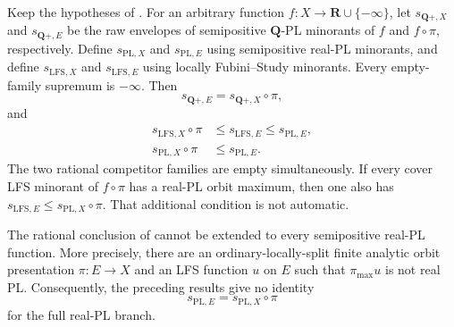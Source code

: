 \begin{theorem}
\label{thm:p031-orbit-envelope-comparison}
Keep the hypotheses of .  For an
arbitrary function $f:X\to\mathbf R\cup\{-\infty\}$, let
$s_{\mathbf Q+,X}$ and $s_{\mathbf Q+,E}$ be the raw envelopes of
semipositive $\mathbf Q$-PL minorants of $f$ and $f\circ\pi$,
respectively.  Define $s_{\mathrm{PL},X}$ and $s_{\mathrm{PL},E}$ using
semipositive real-PL minorants, and define $s_{\mathrm{LFS},X}$ and
$s_{\mathrm{LFS},E}$ using locally Fubini--Study minorants.  Every
empty-family supremum is $-\infty$.  Then
\begin{equation}
\label{eq:p031-rational-semipositive-envelope-pullback}
                  s_{\mathbf Q+,E}
                    =s_{\mathbf Q+,X}\circ\pi,
\end{equation}
and
\begin{equation}
\label{eq:p031-lfs-pl-envelope-chain}
 \begin{aligned}
 s_{\mathrm{LFS},X}\circ\pi
       &\leq s_{\mathrm{LFS},E}\leq s_{\mathrm{PL},E},\\
 s_{\mathrm{PL},X}\circ\pi
       &\leq s_{\mathrm{PL},E}.
 \end{aligned}
\end{equation}
The two rational competitor families are empty simultaneously. If every
cover LFS minorant of $f\circ\pi$ has a real-PL orbit maximum, then one
also has $s_{\mathrm{LFS},E}\leq s_{\mathrm{PL},X}\circ\pi$.
That additional condition is not automatic.
\end{theorem}

\begin{proposition}
\label{prop:p031-real-pl-fiber-maximum-failure}
The rational conclusion of  cannot be
extended to every semipositive real-PL function.  More precisely, there are
an ordinary-locally-split finite analytic orbit presentation
$\pi:E\to X$ and an LFS function $u$ on $E$ such that $\pi_{\max}u$
is not real PL.
Consequently, the preceding results give no identity
\[
                    s_{\mathrm{PL},E}
                       =s_{\mathrm{PL},X}\circ\pi
\]
for the full real-PL branch.
\end{proposition}
